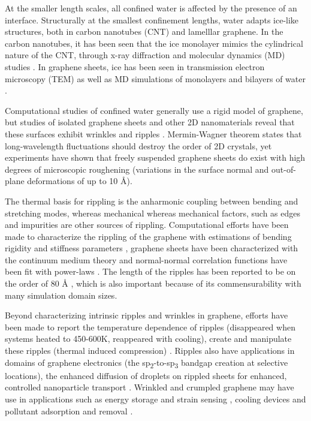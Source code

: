 \documentclass[12pt]{article}
\begin{document}
At the smaller length scales, all confined water is affected by the presence of an interface. Structurally at the smallest confinement lengths, water adapts ice-like structures, both in carbon nanotubes (CNT) and lamelllar graphene. In the carbon nanotubes, it has been seen that the ice monolayer mimics the cylindrical nature of the CNT, through x-ray diffraction and molecular dynamics (MD) studies \cite{Maniwa2005}. In graphene sheets, ice has been seen in transmission electron microscopy (TEM) \cite{Algara-Siller2015} as well as MD simulations of monolayers and bilayers of water \cite{Zangi2003,Zangi2003_2}.

Computational studies of confined water generally use a rigid model of graphene, but studies of isolated graphene sheets and other 2D nanomaterials reveal that these surfaces exhibit wrinkles and ripples  \cite{Fasolino2007, Los2009, Gao2014}. Mermin-Wagner theorem \cite{Mermin1968} states that long-wavelength fluctuations should destroy the order of 2D crystals, yet experiments have shown \cite{Meyer2007} that freely suspended graphene sheets do exist with high degrees of microscopic roughening (variations in the surface normal and out-of-plane deformations of up to 10 \r A).

The thermal basis for rippling is the anharmonic coupling between bending and stretching modes, whereas mechanical whereas mechanical factors, such as edges and impurities are other sources of rippling. Computational efforts have been made to characterize the rippling of the graphene with estimations of bending rigidity and stiffness parameters \cite{Wei2012}, graphene sheets have been characterized with the continuum medium theory and normal-normal correlation functions have been fit with power-laws \cite{Los2009}. The length of the ripples has been reported to be on the order of 80 \r A \cite{Fasolino2007, Los2009}, which is also important because of its commensurability with many simulation domain sizes.

Beyond characterizing intrinsic ripples and wrinkles in graphene, efforts have been made to report the temperature dependence of ripples (disappeared when systems heated to 450-600K, reappeared with cooling), create and manipulate these ripples (thermal induced compression) \cite{Bao2009}. Ripples also have applications in domains of graphene electronics (the sp\textsubscript{2}-to-sp\textsubscript{3} bandgap creation at selective locations), the enhanced diffusion of droplets on rippled sheets for enhanced, controlled nanoparticle transport \cite{Ma2016}. Wrinkled and crumpled graphene may have use in applications such as energy storage and strain sensing \cite{Deng2016}, cooling devices \cite{Warzoha2014} and pollutant adsorption and removal \cite{Wang2016}.
\end{document}
